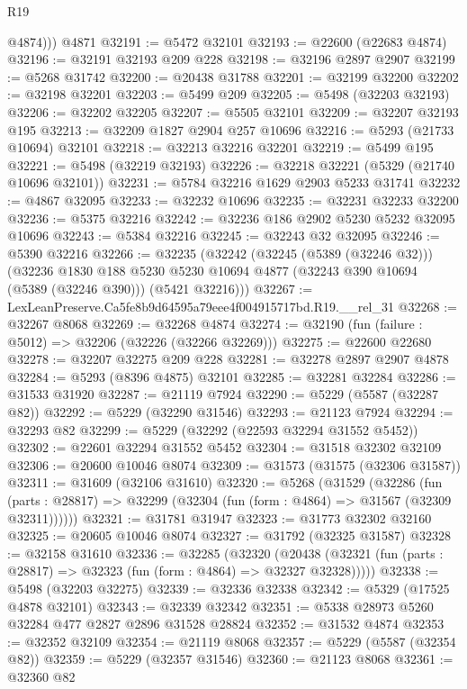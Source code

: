 \begin{lexlean}{R19}
\begin{coremodule}
          @4874)))
    @4871
@32191 := @5472 @32101
@32193 := @22600 (@22683 @4874)
@32196 := @32191 @32193 @209 @228
@32198 := @32196 @2897 @2907
@32199 := @5268 @31742
@32200 := @20438 @31788
@32201 := @32199 @32200
@32202 := @32198 @32201
@32203 := @5499 @209
@32205 := @5498 (@32203 @32193)
@32206 := @32202 @32205
@32207 := @5505 @32101
@32209 := @32207 @32193 @195
@32213 := @32209 @1827 @2904 @257 @10696
@32216 := @5293 (@21733 @10694) @32101
@32218 := @32213 @32216 @32201
@32219 := @5499 @195
@32221 := @5498 (@32219 @32193)
@32226 := @32218 @32221 (@5329 (@21740 @10696 @32101))
@32231 := @5784 @32216 @1629 @2903 @5233 @31741
@32232 := @4867 @32095
@32233 := @32232 @10696
@32235 := @32231 @32233 @32200
@32236 := @5375 @32216
@32242 := @32236 @186 @2902 @5230 @5232 @32095 @10696
@32243 := @5384 @32216
@32245 := @32243 @32 @32095
@32246 := @5390 @32216
@32266 := @32235
    (@32242
      (@32245 (@5389 (@32246 @32)))
      (@32236
        @1830
        @188
        @5230
        @5230
        @10694
        @4877
        (@32243 @390 @10694 (@5389 (@32246 @390)))
        (@5421 @32216)))
@32267 := LexLeanPreserve.Ca5fe8b9d64595a79eee4f004915717bd.R19.__rel_31
@32268 := @32267 @8068
@32269 := @32268 @4874
@32274 := @32190 (fun (failure : @5012) => @32206 (@32226 (@32266 @32269)))
@32275 := @22600 @22680
@32278 := @32207 @32275 @209 @228
@32281 := @32278 @2897 @2907 @4878
@32284 := @5293 (@8396 @4875) @32101
@32285 := @32281 @32284
@32286 := @31533 @31920
@32287 := @21119 @7924
@32290 := @5229 (@5587 (@32287 @82))
@32292 := @5229 (@32290 @31546)
@32293 := @21123 @7924
@32294 := @32293 @82
@32299 := @5229 (@32292 (@22593 @32294 @31552 @5452))
@32302 := @22601 @32294 @31552 @5452
@32304 := @31518 @32302 @32109
@32306 := @20600 @10046 @8074
@32309 := @31573 (@31575 (@32306 @31587))
@32311 := @31609 (@32106 @31610)
@32320 := @5268
    (@31529
      (@32286
        (fun (parts : @28817) => @32299 (@32304 (fun (form : @4864) => @31567 (@32309 @32311))))))
@32321 := @31781 @31947
@32323 := @31773 @32302 @32160
@32325 := @20605 @10046 @8074
@32327 := @31792 (@32325 @31587)
@32328 := @32158 @31610
@32336 := @32285
    (@32320
      (@20438 (@32321 (fun (parts : @28817) => @32323 (fun (form : @4864) => @32327 @32328)))))
@32338 := @5498 (@32203 @32275)
@32339 := @32336 @32338
@32342 := @5329 (@17525 @4878 @32101)
@32343 := @32339 @32342
@32351 := @5338 @28973 @5260 @32284 @477 @2827 @2896 @31528 @28824
@32352 := @31532 @4874
@32353 := @32352 @32109
@32354 := @21119 @8068
@32357 := @5229 (@5587 (@32354 @82))
@32359 := @5229 (@32357 @31546)
@32360 := @21123 @8068
@32361 := @32360 @82

\end{coremodule}
\end{lexlean}
